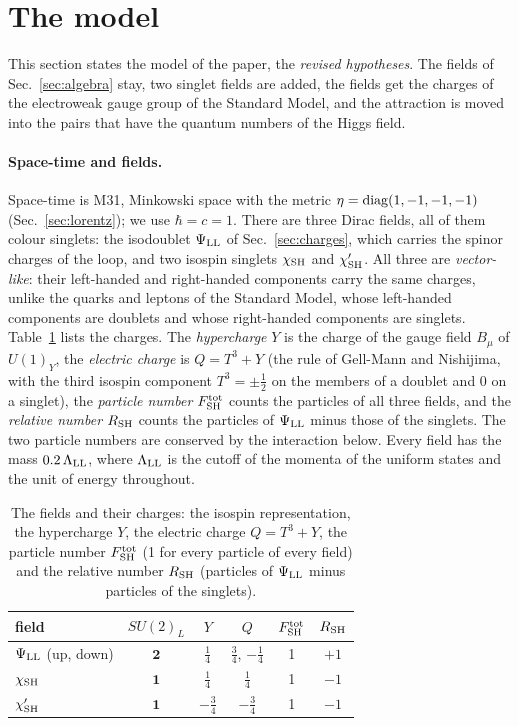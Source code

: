 \documentclass[aps,prd,twocolumn,superscriptaddress,nofootinbib,floatfix,longbibliography]{revtex4-2}
\newcommand{\LL}{{\rm LL}}
\newcommand{\SH}{{\rm SH}}
\begin{document}
\section{The model}
\label{sec:model}

This section states the model of the paper, the \emph{revised hypotheses}. The fields of Sec.~\ref{sec:algebra} stay,
two singlet fields are added, the fields get the charges of the electroweak gauge group of the Standard Model, and the
attraction is moved into the pairs that have the quantum numbers of the Higgs field.

\paragraph*{Space-time and fields.}
Space-time is M31, Minkowski space with the metric $\eta={\rm diag}(1,-1,-1,-1)$ (Sec.~\ref{sec:lorentz}); we use
$\hbar=c=1$. There are three Dirac fields, all of them colour singlets: the isodoublet $\Psi_\LL$ of
Sec.~\ref{sec:charges}, which carries the spinor charges of the loop, and two isospin singlets $\chi_\SH$ and
$\chi'_\SH$. All three are \emph{vector-like}: their left-handed and right-handed components carry the same charges,
unlike the quarks and leptons of the Standard Model, whose left-handed components are doublets and whose right-handed
components are singlets. Table~\ref{tab:fields} lists the charges. The \emph{hypercharge} $Y$ is the charge of the gauge
field $B_\mu$ of $U(1)_Y$, the \emph{electric charge} is $Q=T^3+Y$ (the rule of Gell-Mann and Nishijima, with the third
isospin component $T^3=\pm\frac12$ on the members of a doublet and 0 on a singlet), the \emph{particle number}
$F^{\rm tot}_\SH$ counts the particles of all three fields, and the \emph{relative number} $R_\SH$ counts the particles of
$\Psi_\LL$ minus those of the singlets. The two particle numbers are conserved by the interaction below. Every field has
the mass $0.2\,\Lambda_\LL$, where $\Lambda_\LL$ is the cutoff of the momenta of the uniform states and the unit of energy
throughout.

\begin{table}[t]
\caption{The fields and their charges: the isospin representation, the hypercharge $Y$, the electric charge
$Q=T^3+Y$, the particle number $F^{\rm tot}_\SH$ (1 for every particle of every field) and the relative number $R_\SH$
(particles of $\Psi_\LL$ minus particles of the singlets).}
\label{tab:fields}
\begin{ruledtabular}
\begin{tabular}{lccccc}
field & $SU(2)_L$ & $Y$ & $Q$ & $F^{\rm tot}_\SH$ & $R_\SH$\\
\hline
$\Psi_\LL$ (up, down) & $\mathbf 2$ & $\frac14$ & $\frac34$, $-\frac14$ & 1 & $+1$\\
$\chi_\SH$ & $\mathbf 1$ & $\frac14$ & $\frac14$ & 1 & $-1$\\
$\chi'_\SH$ & $\mathbf 1$ & $-\frac34$ & $-\frac34$ & 1 & $-1$\\
\end{tabular}
\end{ruledtabular}
\end{table}
\end{document}
